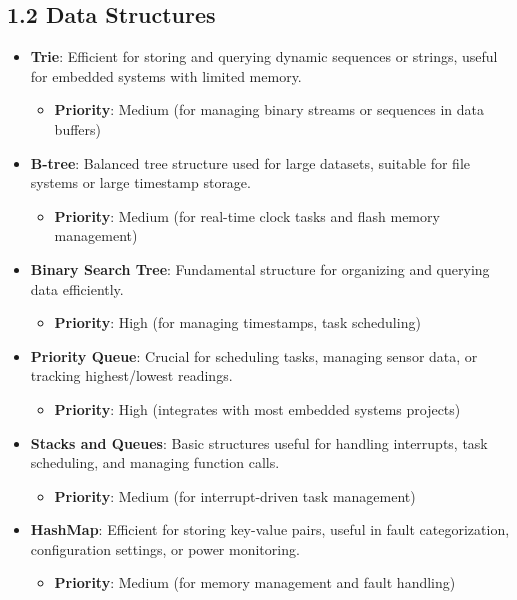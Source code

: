 \documentclass{article}
\begin{document}
\subsection*{1.2 Data Structures}
\begin{itemize}
    \item \textbf{Trie}: Efficient for storing and querying dynamic sequences or strings, useful for embedded systems with limited memory.
    \begin{itemize}
        \item \textbf{Priority}: Medium (for managing binary streams or sequences in data buffers)
    \end{itemize}
    
    \item \textbf{B-tree}: Balanced tree structure used for large datasets, suitable for file systems or large timestamp storage.
    \begin{itemize}
        \item \textbf{Priority}: Medium (for real-time clock tasks and flash memory management)
    \end{itemize}
    
    \item \textbf{Binary Search Tree}: Fundamental structure for organizing and querying data efficiently.
    \begin{itemize}
        \item \textbf{Priority}: High (for managing timestamps, task scheduling)
    \end{itemize}
    
    \item \textbf{Priority Queue}: Crucial for scheduling tasks, managing sensor data, or tracking highest/lowest readings.
    \begin{itemize}
        \item \textbf{Priority}: High (integrates with most embedded systems projects)
    \end{itemize}
    
    \item \textbf{Stacks and Queues}: Basic structures useful for handling interrupts, task scheduling, and managing function calls.
    \begin{itemize}
        \item \textbf{Priority}: Medium (for interrupt-driven task management)
    \end{itemize}
    
    \item \textbf{HashMap}: Efficient for storing key-value pairs, useful in fault categorization, configuration settings, or power monitoring.
    \begin{itemize}
        \item \textbf{Priority}: Medium (for memory management and fault handling)
    \end{itemize}
\end{itemize}
\end{document}
